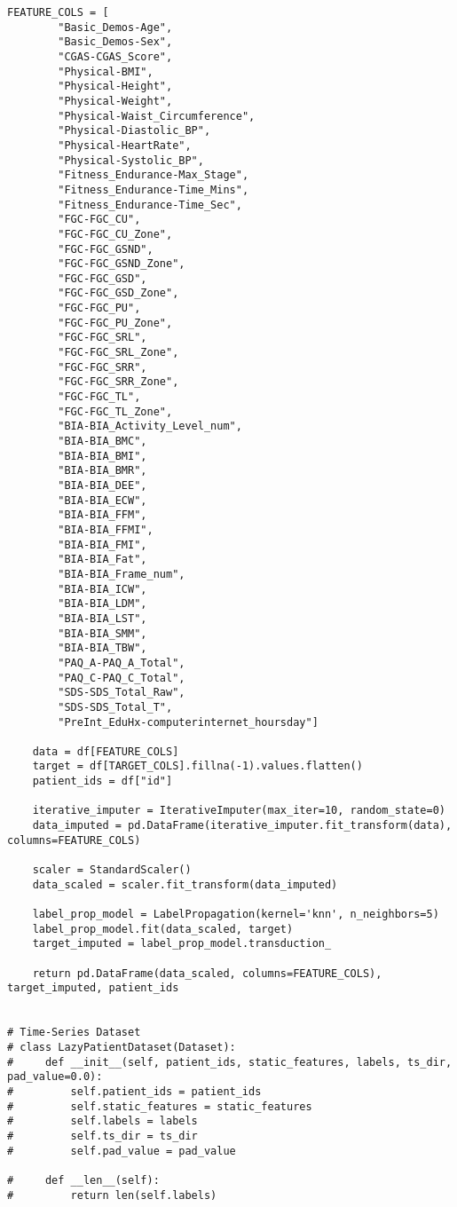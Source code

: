 \begin{appendices}
\begin{mdframed}
\begin{lstlisting}[breaklines=true]
    FEATURE_COLS = [
        "Basic_Demos-Age",
        "Basic_Demos-Sex",
        "CGAS-CGAS_Score",
        "Physical-BMI",
        "Physical-Height",
        "Physical-Weight",
        "Physical-Waist_Circumference",
        "Physical-Diastolic_BP",
        "Physical-HeartRate",
        "Physical-Systolic_BP",
        "Fitness_Endurance-Max_Stage",
        "Fitness_Endurance-Time_Mins",
        "Fitness_Endurance-Time_Sec",
        "FGC-FGC_CU",
        "FGC-FGC_CU_Zone",
        "FGC-FGC_GSND",
        "FGC-FGC_GSND_Zone",
        "FGC-FGC_GSD",
        "FGC-FGC_GSD_Zone",
        "FGC-FGC_PU",
        "FGC-FGC_PU_Zone",
        "FGC-FGC_SRL",
        "FGC-FGC_SRL_Zone",
        "FGC-FGC_SRR",
        "FGC-FGC_SRR_Zone",
        "FGC-FGC_TL",
        "FGC-FGC_TL_Zone",
        "BIA-BIA_Activity_Level_num",
        "BIA-BIA_BMC",
        "BIA-BIA_BMI",
        "BIA-BIA_BMR",
        "BIA-BIA_DEE",
        "BIA-BIA_ECW",
        "BIA-BIA_FFM",
        "BIA-BIA_FFMI",
        "BIA-BIA_FMI",
        "BIA-BIA_Fat",
        "BIA-BIA_Frame_num",
        "BIA-BIA_ICW",
        "BIA-BIA_LDM",
        "BIA-BIA_LST",
        "BIA-BIA_SMM",
        "BIA-BIA_TBW",
        "PAQ_A-PAQ_A_Total",
        "PAQ_C-PAQ_C_Total",
        "SDS-SDS_Total_Raw",
        "SDS-SDS_Total_T",
        "PreInt_EduHx-computerinternet_hoursday"]

    data = df[FEATURE_COLS]
    target = df[TARGET_COLS].fillna(-1).values.flatten()
    patient_ids = df["id"]

    iterative_imputer = IterativeImputer(max_iter=10, random_state=0)
    data_imputed = pd.DataFrame(iterative_imputer.fit_transform(data), columns=FEATURE_COLS)

    scaler = StandardScaler()
    data_scaled = scaler.fit_transform(data_imputed)

    label_prop_model = LabelPropagation(kernel='knn', n_neighbors=5)
    label_prop_model.fit(data_scaled, target)
    target_imputed = label_prop_model.transduction_

    return pd.DataFrame(data_scaled, columns=FEATURE_COLS), target_imputed, patient_ids


# Time-Series Dataset
# class LazyPatientDataset(Dataset):
#     def __init__(self, patient_ids, static_features, labels, ts_dir, pad_value=0.0):
#         self.patient_ids = patient_ids
#         self.static_features = static_features
#         self.labels = labels
#         self.ts_dir = ts_dir
#         self.pad_value = pad_value

#     def __len__(self):
#         return len(self.labels)


\end{lstlisting}
\end{mdframed}
\end{appendices}

